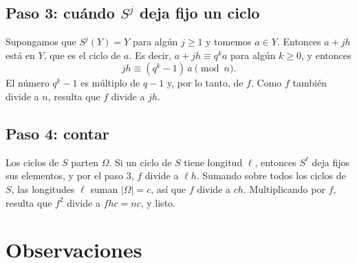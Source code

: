 \documentclass[11pt]{amsproc}
\begin{document}
\subsection*{Paso 3: cuándo $S^j$ deja fijo un ciclo}

Supongamos que $S^j(Y)=Y$ para algún $j\ge 1$ y tomemos $a\in Y$. Entonces
$a+jh$ está en $Y$, que es el ciclo de $a$. Es decir, $a+jh\equiv q^ka$ para
algún $k\ge 0$, y entonces
\[
  jh\equiv (q^k-1)\,a\pmod n.
\]
El número $q^k-1$ es múltiplo de $q-1$ y, por lo tanto, de $f$. Como $f$
también divide a $n$, resulta que $f$ divide a $jh$.

\subsection*{Paso 4: contar}

Los ciclos de $S$ parten $\Omega$. Si un ciclo de $S$ tiene longitud $\ell$,
entonces $S^\ell$ deja fijos sus elementos, y por el paso 3, $f$ divide a
$\ell h$. Sumando sobre todos los ciclos de $S$, las longitudes $\ell$ suman
$|\Omega|=c$, así que $f$ divide a $ch$. Multiplicando por $f$, resulta que
$f^2$ divide a $fhc=nc$, y listo.

\section*{Observaciones}
\end{document}

